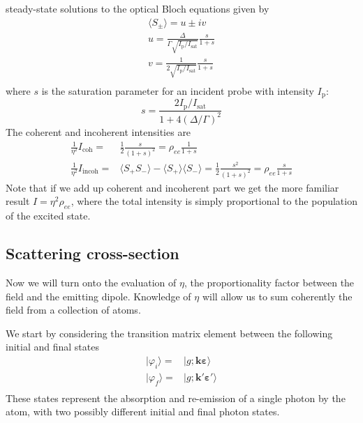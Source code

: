 \documentclass[11pt,letter]{article}
\newcommand{\bv}[1]{\ensuremath{\bm{#1}}}
\begin{document}
steady-state solutions to the optical Bloch equations given by
\begin{gather} 
    \langle S_{\pm} \rangle =  u \pm i v  \\
    u =  \frac{ \Delta }{ \Gamma  \sqrt{ I_{\mathrm{p}} / I_{\mathrm{sat}}} } 
         \frac{s}{ 1 + s } \\
    v =  \frac{ 1 } { 2 \sqrt{ I_{\mathrm{p}} / I_{\mathrm{sat}}} } 
         \frac{s}{1+s} \\
\end{gather}
where $s$ is the saturation parameter for an incident probe with intensity
$I_{\mathrm{p}}$:
\begin{equation}
s = \frac{ 2  I_{\mathrm{p}}/I_{\mathrm{sat}} } { 1 + 4(\Delta/\Gamma)^{2} } 
\end{equation}
The coherent and incoherent intensities are
\begin{equation}
\begin{split} 
    \frac{1}{\eta^{2}}  I_{\mathrm{coh}} = &
        \frac{1}{2} \frac{s}{(1+s)^{2} } 
      = \rho_{ee}  \frac{1}{1+s} \\
    \frac{1}{\eta^{2}}  I_{\mathrm{incoh}}  = & 
        \langle S_{+}S_{-} \rangle - \langle S_{+} \rangle \langle S_{-} \rangle
      = \frac{1}{2} \frac{s^{2}}{(1+s)^{2}} = \rho_{ee} \frac{s}{1+s}
 \label{eq:coh-incoh} 
\end{split}
\end{equation}
Note that if we add up coherent and incoherent part we get the more familiar result $I=\eta^{2} \rho_{ee}$, where the total intensity is simply proportional to the population of the excited state.


\subsection{Scattering cross-section}

Now we will turn onto the evaluation of $\eta$, the proportionality factor
between the field and the emitting dipole.  Knowledge of $\eta$ will allow us
to sum coherently the field from a collection of atoms. 

We start by considering the  transition matrix element between the following
initial and final states 
\begin{equation}
\begin{split}
    | \varphi_{i} \rangle = & | g ; \bv{k}\bv{\varepsilon} \rangle \\
    | \varphi_{f} \rangle = & | g ; \bv{k}'\bv{\varepsilon}' \rangle \\
\end{split}
\end{equation}
These states represent the absorption and re-emission of a single photon by the
atom, with two possibly different initial and final photon states.
 
\end{document}
